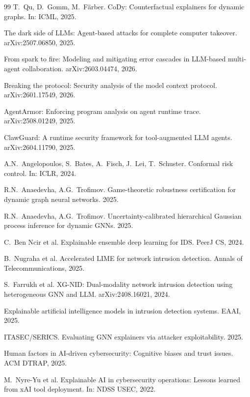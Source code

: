 \documentclass[preprint,review,12pt]{elsarticle}
\begin{document}
\begin{thebibliography}{99}
 T.~Qu, D.~Gomm, M.~F\"{a}rber. CoDy: Counterfactual explainers for dynamic graphs. In: ICML, 2025.

 The dark side of LLMs: Agent-based attacks for complete computer takeover. arXiv:2507.06850, 2025.

 From spark to fire: Modeling and mitigating error cascades in LLM-based multi-agent collaboration. arXiv:2603.04474, 2026.

 Breaking the protocol: Security analysis of the model context protocol. arXiv:2601.17549, 2026.

 AgentArmor: Enforcing program analysis on agent runtime trace. arXiv:2508.01249, 2025.

 ClawGuard: A runtime security framework for tool-augmented LLM agents. arXiv:2604.11790, 2025.

 A.N.~Angelopoulos, S.~Bates, A.~Fisch, J.~Lei, T.~Schuster. Conformal risk control. In: ICLR, 2024.

 R.N.~Anaedevha, A.G.~Trofimov. Game-theoretic robustness certification for dynamic graph neural networks. 2025.

 R.N.~Anaedevha, A.G.~Trofimov. Uncertainty-calibrated hierarchical Gaussian process inference for dynamic GNNs. 2025.

 C.~Ben Ncir et al. Explainable ensemble deep learning for IDS. PeerJ CS, 2024.

 B.~Nugraha et al. Accelerated LIME for network intrusion detection. Annals of Telecommunications, 2025.

 S.~Farrukh et al. XG-NID: Dual-modality network intrusion detection using heterogeneous GNN and LLM. arXiv:2408.16021, 2024.

 Explainable artificial intelligence models in intrusion detection systems. EAAI, 2025.

 ITASEC/SERICS. Evaluating GNN explainers via attacker exploitability. 2025.

 Human factors in AI-driven cybersecurity: Cognitive biases and trust issues. ACM DTRAP, 2025.

 M.~Nyre-Yu et al. Explainable AI in cybersecurity operations: Lessons learned from xAI tool deployment. In: NDSS USEC, 2022.


\end{thebibliography}
\end{document}
